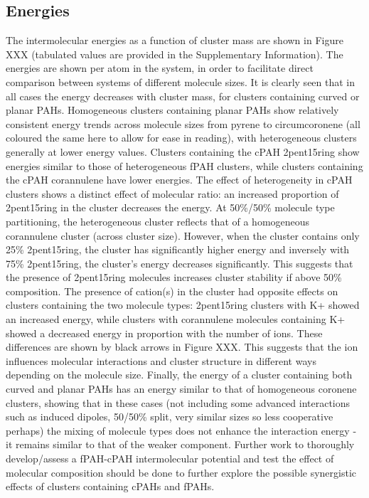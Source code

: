\subsection{Energies}
The intermolecular energies as a function of cluster mass are shown in Figure XXX (tabulated values are provided in the Supplementary Information).  The energies are shown per atom in the system, in order to facilitate direct comparison between systems of different molecule sizes.
It is clearly seen that in all cases the energy decreases with cluster mass, for clusters containing curved or planar PAHs.  Homogeneous clusters containing planar PAHs show relatively consistent energy trends across molecule sizes from pyrene to circumcoronene (all coloured the same here to allow for ease in reading), with heterogeneous clusters generally at lower energy values.  Clusters containing the cPAH 2pent15ring show energies similar to those of heterogeneous fPAH clusters, while clusters containing the cPAH corannulene have lower energies.
The effect of heterogeneity in cPAH clusters shows a distinct effect of molecular ratio: an increased proportion of 2pent15ring in the cluster decreases the energy. At 50\%/50\% molecule type partitioning, the heterogeneous cluster reflects that of a homogeneous corannulene cluster (across cluster size). However, when the cluster contains only 25\% 2pent15ring, the cluster has significantly higher energy and inversely with 75\% 2pent15ring, the cluster's energy decreases significantly.  This suggests that the presence of 2pent15ring molecules increases cluster stability if above 50\% composition.
The presence of cation(s) in the cluster had opposite effects on clusters containing the two molecule types: 2pent15ring clusters with K+ showed an increased energy, while clusters with corannulene molecules containing K+ showed a decreased energy in proportion with the number of ions.  These differences are shown by black arrows in Figure XXX. This suggests that the ion influences molecular interactions and cluster structure in different ways depending on the molecule size.
Finally, the energy of a cluster containing both curved and planar PAHs has an energy similar to that of homogeneous coronene clusters, showing that in these cases (not including some advanced interactions such as induced dipoles, 50/50\% split, very similar sizes so less cooperative perhaps) the mixing of molecule types does not enhance the interaction energy - it remains similar to that of the weaker component.  Further work to thoroughly develop/assess a fPAH-cPAH intermolecular potential and test the effect of molecular composition should be done to further explore the possible synergistic effects of clusters containing cPAHs and fPAHs.
%
%

